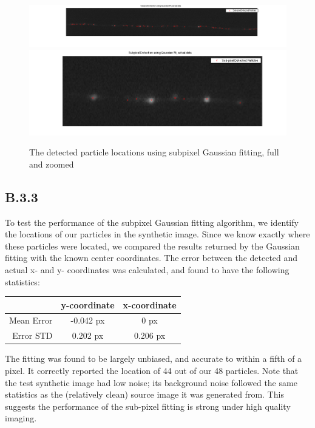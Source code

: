\documentclass{article}
\begin{document}
\begin{figure}[H]
\centering
\includegraphics[width=16cm]{figures/subpixel_real_full.png}
\includegraphics[width=16cm]{figures/subpixel_real_zoom.png}
\caption{The detected particle locations using subpixel Gaussian fitting, full and zoomed}
\label{fig:subpixelReal}
\end{figure}


\subsection*{B.3.3}

To test the performance of the subpixel Gaussian fitting algorithm, we identify the locations of our particles in the synthetic image. Since we know exactly where these particles were located, we compared the results returned by the Gaussian fitting with the known center coordinates. The error between the detected and actual x- and y- coordinates was calculated, and found to have the following statistics:

\begin{center}
\begin{tabular}{r | c | c}
               & y-coordinate & x-coordinate \\ \hline
    Mean Error & -0.042 px      & 0 px       \\
    Error STD  & 0.202 px       & 0.206 px
\end{tabular}
\end{center}

The fitting was found to be largely unbiased, and accurate to within a fifth of a pixel. It correctly reported the location of 44 out of our 48 particles. Note that the test synthetic image had low noise; its background noise followed the same statistics as the (relatively clean) source image it was generated from. This suggests the performance of the sub-pixel fitting is strong under high quality imaging.
\end{document}
